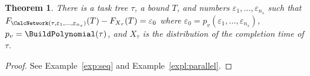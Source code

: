 \documentclass{article}
\newtheorem{theorem}{Theorem}
\newtheorem{lemma}{Lemma}
\begin{document}
%
%


\begin{theorem}\label{theorem:tight}
There is a task tree $\tau$, a bound $T$, and numbers $\varepsilon_1, \dots, \varepsilon_{n_s}$ 
such that $F_{\CalcNetwork(\tau, \varepsilon_1, \dots, \varepsilon_{n_s})}( T) - F_{X_\tau}(T) = \varepsilon_0$ where $\varepsilon_0=p_v(\varepsilon_1, \dots, \varepsilon_{n_s}) $,
$p_v=\BuildPolynomial(\tau)$, and $X_\tau$ is the distribution of the completion time of $\tau$. 
\end{theorem}
\begin{proof}
See Example~\ref{exp:seq} and Example~\ref{expl:parallel}.
\end{proof}

\end{document}
